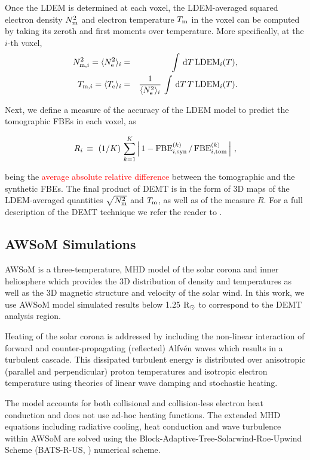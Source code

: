\documentclass[namedreferences]{solarphysics}
\def\edit#1{\textcolor{Red}{#1}}
\newcommand{\mrsun}{{\rm R_\odot}}
\newcommand{\LDEM}{{\rm LDEM}}
\newcommand{\FBE}{{\rm FBE}}
\newcommand{\Te}{T_{\rm e}}
\newcommand{\Tm}{T_{\rm m}}
\newcommand{\Tmi}{T_{{\rm m},i}}
\newcommand{\Ne}{N_{\rm e}}
\newcommand{\Nm}{N_{\rm m}}
\newcommand{\Nsqmi}{N^2_{{\rm m},i}}
\newcommand{\Nsqm}{N^2_{{\rm m}}}
\newcommand{\sqravgN}{\sqrt{\Nsqm}}
\begin{document}
\begin{article}
Once the LDEM is determined at each voxel, {the LDEM-averaged squared electron density $\Nm^2$ and electron temperature $\Tm$} in the voxel can be computed by taking its zeroth and first moments over temperature. More specifically, at the $i$-th voxel,
{
\begin{eqnarray}\label{momento1}
 \Nsqmi = \langle \Ne^2 \rangle_i &=& \int\,\textrm{d}T\,\LDEM_i(T),\label{Ne} \\ 
\label{momento2}
 \Tmi  = \langle \Te \rangle_i &=& \frac{1}{\langle \Ne^2 \rangle_i}\,\int\,\textrm{d}T\,T\,\LDEM_i(T).\label{Tm} 
\end{eqnarray}
}

Next, we define a measure of the accuracy of the LDEM model to predict the tomographic FBEs in each voxel, as

\begin{equation}\label{R}
R_i \, \equiv \ (1/K) \, \sum_{k=1}^K \left| \, 1 - \FBE^{(k)}_{i,\rm syn}\,/\,\FBE^{(k)}_{i,\rm tom}\, \right| \,,
\end{equation}

\noindent 
{being the} \edit{average absolute relative difference} between the tomographic and the synthetic FBEs. {The final product of DEMT is in the form of 3D maps of the LDEM-averaged quantities $\sqravgN$ and $\Tm$, as well as of the measure $R$.} {For a full description of the {DEMT technique} we refer the reader to \citet{frazin_2009}.}

\subsection{{AWSoM Simulations}}\label{awsom} 

{AWSoM is a three-temperature}, MHD model of the solar corona and inner heliosphere which provides the 3D distribution of density and temperatures as well as the 3D magnetic structure and velocity of the solar wind. In this work, we use AWSoM model simulated results below 1.25 $\mrsun$ to correspond to the DEMT analysis region.

{Heating of the solar corona is addressed} by including the non-linear interaction of forward and counter-propagating (reflected) Alfv\'{e}n waves which results in a turbulent cascade. This dissipated turbulent energy is distributed over anisotropic (parallel and perpendicular) proton temperatures and isotropic electron temperature using theories of linear wave damping and stochastic heating.

{The model accounts} for both collisional and collision-less electron heat conduction and does not use ad-hoc heating functions. The extended MHD equations including radiative cooling, heat conduction and wave turbulence within AWSoM \citep{Van2014} are solved using the Block-Adaptive-Tree-Solarwind-Roe-Upwind Scheme (BATS-R-US, \citealp{Pow1999, Tot2012}) numerical scheme. 


\end{article}
\end{document}
